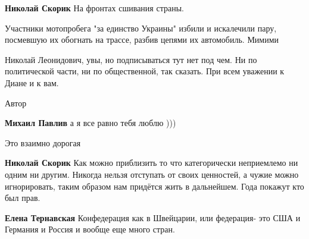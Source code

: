 \begin{itemize}
\begin{itemize}
\textbf{Николай Скорик} На фронтах сшивания страны.

Участники мотопробега "за единство Украины" избили и искалечили пару, посмевшую
их обогнать на трассе, разбив цепями их автомобиль. Мимими


 

Николай Леонидович, увы, но подписываться тут нет под чем. Ни по политической
части, ни по общественной, так сказать. При всем уважении к Диане и к вам.



Автор
 
\textbf{Михаил Павлив} а я все равно тебя люблю )))

 

Это взаимно дорогая \Smiley[1.0][yellow]

 
\textbf{Николай Скорик} Как можно приблизить то что категорически неприемлемо
ни одним ни другим. Никогда нельзя отступать от своих ценностей, а чужие можно
игнорировать, таким образом нам придётся жить в дальнейшем. Года покажут кто
был прав.

 
\textbf{Елена Тернавская} Конфедерация как в Швейцарии, или федерация- это США
и Германия и Россия и вообще еще много стран.


\end{itemize}
\end{itemize}
